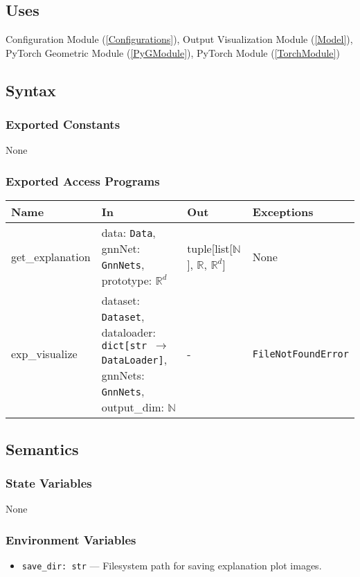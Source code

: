\documentclass[12pt, titlepage]{article}
\begin{document}
\subsection{Uses}
Configuration Module (\ref{Configurations}), Output Visualization Module (\ref{Model}), PyTorch Geometric Module (\ref{PyGModule}), PyTorch Module (\ref{TorchModule})

\subsection{Syntax}

\subsubsection{Exported Constants}
None

\subsubsection{Exported Access Programs}

\begin{center}
\begin{tabular}{p{3cm} >{\raggedright\arraybackslash}p{5cm} p{5cm} p{2.5cm}}
\hline
\textbf{Name} & \textbf{In} & \textbf{Out} & \textbf{Exceptions} \\
\hline
get\_explanation & data: \texttt{Data}, gnnNet: \texttt{GnnNets}, prototype: \(\mathbb{R}^d\) & tuple[list[\(\mathbb{N}\)], \(\mathbb{R}\), \(\mathbb{R}^{d}\)] & None \\
exp\_visualize & dataset: \texttt{Dataset}, dataloader: \texttt{dict[str \(\rightarrow\) DataLoader]}, gnnNets: \texttt{GnnNets}, output\_dim: \(\mathbb{N}\) & - & \texttt{FileNotFoundError} \\
\hline
\end{tabular}
\end{center}

\subsection{Semantics}

\subsubsection{State Variables}
None

\subsubsection{Environment Variables}
\begin{itemize}
  \item \texttt{save\_dir: str} — Filesystem path for saving explanation plot images.
\end{itemize}
\end{document}
